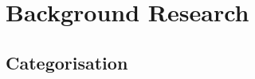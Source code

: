 \documentclass[main]{subfiles}
\begin{document}
\chapter{Background Research}

\section{Categorisation}
\end{document}
